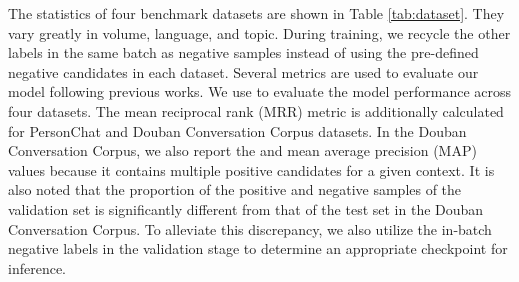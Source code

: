 The statistics of four benchmark datasets are shown in Table \ref{tab:dataset}. They vary greatly in volume, language, and topic. During training, we recycle the other labels in the same batch as negative samples instead of using the pre-defined negative candidates in each dataset. Several metrics are used to evaluate our model following previous works. We use  to evaluate the model performance across four datasets. The mean reciprocal rank (MRR) metric is additionally calculated for PersonChat and Douban Conversation Corpus datasets. In the Douban Conversation Corpus, we also report the  and mean average precision (MAP) values because it contains multiple positive candidates for a given context. It is also noted that the proportion of the positive and negative samples of the validation set is significantly different from that of the test set in the Douban Conversation Corpus. To alleviate this discrepancy, we also utilize the in-batch negative labels in the validation stage to determine an appropriate checkpoint for inference. 






